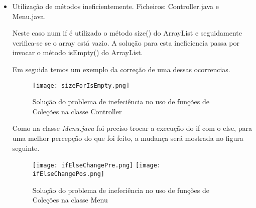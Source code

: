\begin{itemize}
\item Utilização de métodos ineficientemente.\newline
 Ficheiros: Controller.java e Menu.java.\newline


\par Neste caso num if é utilizado o método size() do ArrayList e seguidamente verifica-se se o array está vazio. A solução para esta ineficiencia passa por invocar o método isEmpty() do ArrayList.\newline
\par Em seguida temos um exemplo da correção de uma dessas ocorrencias. 
\begin{figure}[H]

  \centering

  \texttt{[image: sizeForIsEmpty.png]}

  \caption {Solução do problema de inefeciência no uso de funções de Coleções na classe Controller}

  \label {fig10}

\end{figure}


\par Como na classe \textit{Menu.java} foi preciso trocar a execução do if com o else, para uma melhor percepção do que foi feito, a mudança será mostrada no figura seguinte.

\begin{figure}[H]

  \centering

  \texttt{[image: ifElseChangePre.png]}
  \texttt{[image: ifElseChangePos.png]}

  \caption {Solução do problema de inefeciência no uso de funções de Coleções na classe Menu}

  \label {fig11}

\end{figure}

\end{itemize}

